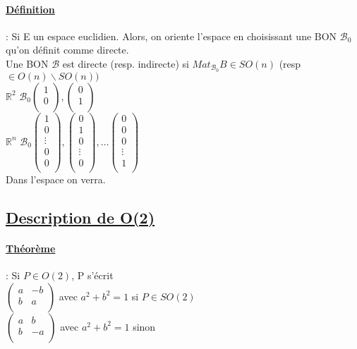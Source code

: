 \documentclass{article}
\begin{document}
\paragraph{\underline{Définition}}: Si E un espace euclidien. Alors, on oriente l'espace en choisissant une BON $\mathcal{B}_0$ qu'on définit comme directe.\\
Une BON $\mathcal{B}$ est directe (resp. indirecte) si $Mat_{\mathcal{B}_0} B \in SO(n)$ (resp $\in O(n) \backslash SO(n))$\\
$\mathbb{R}^2$ $\mathcal{B}_0 \begin{pmatrix}
    1\\
    0\\
\end{pmatrix}, \begin{pmatrix}
    0\\
    1\\
\end{pmatrix}$\\
$\mathbb{R}^n$ $\mathcal{B}_0 \begin{pmatrix}
    1\\
    0\\
    \vdots\\
    0\\
    0\\
\end{pmatrix}, \begin{pmatrix}
    0\\
    1\\
    0\\
    \vdots\\
    0\\
\end{pmatrix}, \dots \begin{pmatrix}
    0\\
    0\\
    0\\
    \vdots\\
    1\\
\end{pmatrix}$\\
Dans l'espace on verra.

\subsection{\underline{Description de O(2)}}

\paragraph{\underline{Théorème}}: Si $P \in O(2)$, P s'écrit\\
$\begin{pmatrix}
    a & -b\\
    b & a\\
\end{pmatrix}$ avec $a^2 + b^2 = 1$ si $P \in SO(2)$\\
$\begin{pmatrix}
    a & b\\
    b & -a\\
\end{pmatrix}$ avec $a^2 + b^2 = 1$ sinon\\
\end{document}
